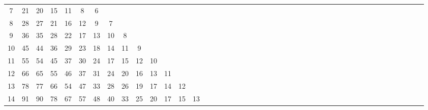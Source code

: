 \documentclass[12pt,a4paper]{amsart}
\theoremstyle{definition} %
\theoremstyle{plain} %
\begin{document}
\begin{table}[h]
{\begin{tabular}{|c|*{44}{c|}}
            7 &  21 &  20 &  15 &  11 &   8 &   6 &     &     &     &      &      &      &      &      &      &      &      &      &      &      &      &      &      &      &      &      &      &      &      &      &      &      &      &      &      &      &      &      &      &      &      &      &      &      \\
            8 &  28 &  27 &  21 &  16 &  12 &   9 &   7 &     &     &      &      &      &      &      &      &      &      &      &      &      &      &      &      &      &      &      &      &      &      &      &      &      &      &      &      &      &      &      &      &      &      &      &      &      \\
            9 &  36 &  35 &  28 &  22 &  17 &  13 &  10 &   8 &     &      &      &      &      &      &      &      &      &      &      &      &      &      &      &      &      &      &      &      &      &      &      &      &      &      &      &      &      &      &      &      &      &      &      &      \\
            10 &  45 &  44 &  36 &  29 &  23 &  18 &  14 &  11 &   9 &      &      &      &      &      &      &      &      &      &      &      &      &      &      &      &      &      &      &      &      &      &      &      &      &      &      &      &      &      &      &      &      &      &      &      \\
            11 &  55 &  54 &  45 &  37 &  30 &  24 &  17 &  15 &  12 &   10 &      &      &      &      &      &      &      &      &      &      &      &      &      &      &      &      &      &      &      &      &      &      &      &      &      &      &      &      &      &      &      &      &      &      \\
            12 &  66 &  65 &  55 &  46 &  37 &  31 &  24 &  20 &  16 &   13 &   11 &      &      &      &      &      &      &      &      &      &      &      &      &      &      &      &      &      &      &      &      &      &      &      &      &      &      &      &      &      &      &      &      &      \\
            13 &  78 &  77 &  66 &  54 &  47 &  33 &  28 &  26 &  19 &   17 &   14 &   12 &      &      &      &      &      &      &      &      &      &      &      &      &      &      &      &      &      &      &      &      &      &      &      &      &      &      &      &      &      &      &      &      \\
            14 &  91 &  90 &  78 &  67 &  57 &  48 &  40 &  33 &  25 &   20 &   17 &   15 &   13 &      &      &      &      &      &      &      &      &      &      &      &      &      &      &      &      &      &      &      &      &      &      &      &      &      &      &      &      &      &      &      \\

\end{tabular}}
\end{table}
\end{document}
